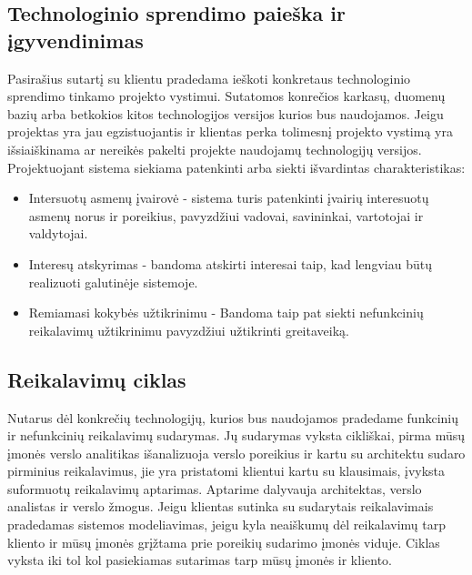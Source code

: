 \documentclass{VUMIFPSkursinis}
\begin{document}
	\subsection{Technologinio sprendimo paieška ir įgyvendinimas}
		Pasirašius sutartį su klientu pradedama ieškoti konkretaus technologinio sprendimo tinkamo projekto vystimui. Sutatomos konrečios karkasų, duomenų bazių arba betkokios kitos technologijos versijos kurios bus naudojamos. Jeigu projektas yra jau egzistuojantis ir klientas perka tolimesnį projekto vystimą yra išsiaiškinama ar nereikės pakelti projekte naudojamų technologijų versijos.
		Projektuojant sistema siekiama patenkinti arba siekti išvardintas charakteristikas:
	\begin{itemize}
		\item{
			Intersuotų asmenų įvairovė - sistema turis patenkinti įvairių interesuotų asmenų norus ir poreikius, pavyzdžiui vadovai, savininkai, vartotojai ir valdytojai.
		}
		\item{Interesų atskyrimas - bandoma atskirti interesai taip, kad lengviau būtų realizuoti galutinėje sistemoje.  }
		\item{Remiamasi kokybės užtikrinimu - Bandoma taip pat siekti nefunkcinių reikalavimų užtikrinimu pavyzdžiui užtikrinti greitaveiką.}
	\end{itemize}
	
	\subsection{Reikalavimų ciklas}
		Nutarus dėl konkrečių technologijų, kurios bus naudojamos pradedame funkcinių ir nefunkcinių reikalavimų sudarymas. Jų sudarymas vyksta cikliškai, pirma mūsų įmonės verslo analitikas išanalizuoja verslo poreikius ir kartu su architektu sudaro pirminius reikalavimus, jie yra pristatomi klientui kartu su klausimais, įvyksta suformuotų reikalavimų aptarimas. Aptarime dalyvauja architektas, verslo analistas ir verslo žmogus. Jeigu klientas sutinka su sudarytais reikalavimais pradedamas sistemos modeliavimas, jeigu kyla neaiškumų dėl reikalavimų tarp kliento ir mūsų įmonės grįžtama prie poreikių sudarimo įmonės viduje. Ciklas vyksta iki tol kol pasiekiamas sutarimas tarp mūsų įmonės ir kliento.
\end{document}
